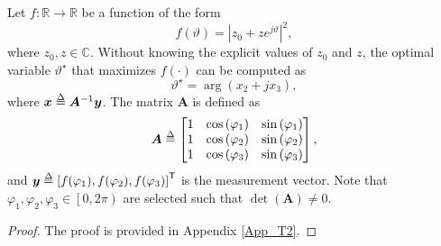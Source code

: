 \documentclass[conference]{IEEEtran}
\begin{document}
\begin{thm}\label{Theorem_2}
Let $f:\mathbb{R}\rightarrow \mathbb{R}$ be a function of the form
$$f{\left(\vartheta\right)}=\left|z_{0}+ ze^{j\vartheta}\right|^{2},$$ 
where $z_{0}, z\in \mathbb{C}$. Without knowing the explicit values of $z_{0}$ and $z$, the optimal variable $\vartheta^{\star}$ that maximizes $f{\left(\cdot\right)}$ can be computed as
\begin{equation}
      \vartheta^{\star}=\arg{\left(x_{2}+j x_{3}\right)},
\end{equation}
where $\bm{x}\delequal \bm{A}^{-1}\bm{y}$. The matrix $\bm{A}$ is defined as 
\begin{equation} \label{eq:A}
\bm{A} \delequal \begin{bmatrix}
1 & \cos\left(\varphi_{1}\right) &  \sin\left(\varphi_{1}\right)\\
1 & \cos\left(\varphi_{2}\right) &  \sin\left(\varphi_{2}\right)\\
1 & \cos\left(\varphi_{3}\right) &  \sin\left(\varphi_{3}\right)
\end{bmatrix},
\end{equation}
and $\bm{y}\delequal\left[f{\left(\varphi_{1}\right)}, f{\left(\varphi_{2}\right)}, f{\left(\varphi_{3}\right)}\right]^\mathsf{T}$ is the measurement vector. Note that $\varphi_{1}, \varphi_{2}, \varphi_{3}\in \left[0, 2\pi\right)$ are selected such that $\det{\left(\bm{A}\right)}\neq 0$. 




\end{thm}
\begin{proof}
The proof is provided in Appendix \ref{App_T2}.
\end{proof}
\end{document}
